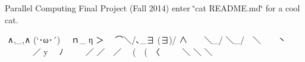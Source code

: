 Parallel Computing Final Project (Fall 2014) enter \char`\"{}cat R\-E\-A\-D\-M\-E.\-md\char`\"{} for a cool cat.

‌ ∧,\-\_\-,∧ (`･ω･´)　 ｎ\-\_\- η ＞　 ⌒＼/､\-\_\-∃ (∃)/ ∧　　＼\-\_\-/ ＼\-\_\-/　＼　　丶 　 　　／ y　 ﾉ 　 　／ ／　／ 　(　(　〈 　 　＼ ＼ ＼ \section*{　 　 }